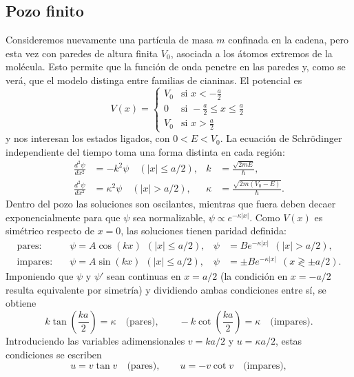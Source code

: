 \documentclass[12pt,a4paper,twocolumn]{informeUNLP} %
\begin{document}
\subsection{Pozo finito} \label{intro:pozo_fin}
Consideremos nuevamente una partícula de masa $m$ confinada en la cadena, pero esta vez con paredes de altura finita $V_0$, asociada a los átomos extremos de la molécula. Esto permite que la función de onda penetre en las paredes y, como se verá, que el modelo distinga entre familias de cianinas. El potencial es
\[
V(x) =
\begin{cases}
V_0 & \text{si } x < -\frac{a}{2} \\
0   & \text{si } -\frac{a}{2} \le x \le \frac{a}{2} \\
V_0 & \text{si } x > \frac{a}{2}
\end{cases}
\]
y nos interesan los estados ligados, con $0<E<V_0$. La ecuación de Schrödinger independiente del tiempo \cite{griffiths2005} toma una forma distinta en cada región:
\begin{align}
\frac{d^2\psi}{dx^2} &= -k^2\psi \quad (|x|\le a/2), & k&=\frac{\sqrt{2mE}}{\hbar}, \\
\frac{d^2\psi}{dx^2} &= \kappa^2\psi \quad (|x|> a/2), & \kappa&=\frac{\sqrt{2m(V_0-E)}}{\hbar}.
\end{align}
Dentro del pozo las soluciones son oscilantes, mientras que fuera deben decaer exponencialmente para que $\psi$ sea normalizable, $\psi\propto e^{-\kappa|x|}$. Como $V(x)$ es simétrico respecto de $x=0$, las soluciones tienen paridad definida:
\begin{align*}
\text{pares:}\quad & \psi=A\cos(kx)\ \ (|x|\le a/2), & \psi&=Be^{-\kappa|x|}\ \ (|x|>a/2),\\
\text{impares:}\quad & \psi=A\sin(kx)\ \ (|x|\le a/2), & \psi&=\pm Be^{-\kappa|x|}\ \ (x\gtrless \pm a/2).
\end{align*}
Imponiendo que $\psi$ y $\psi'$ sean continuas en $x=a/2$ (la condición en $x=-a/2$ resulta equivalente por simetría) y dividiendo ambas condiciones entre sí, se obtiene
\begin{equation}
k\tan\!\left(\frac{ka}{2}\right)=\kappa \quad \text{(pares)},\qquad -k\cot\!\left(\frac{ka}{2}\right)=\kappa \quad \text{(impares)}.
\end{equation}
Introduciendo las variables adimensionales $v=ka/2$ y $u=\kappa a/2$, estas condiciones se escriben
\begin{equation}
u=v\tan v \quad \text{(pares)},\qquad u=-v\cot v \quad \text{(impares)},
\label{eq:empalme}
\end{equation}
\end{document}
